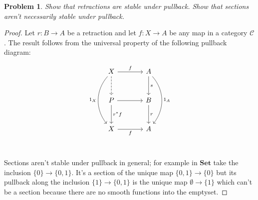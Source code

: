 \documentclass[11pt]{amsart}
\theoremstyle{plain}
\newtheorem{prob}[thm]{Problem}
\theoremstyle{definition}
\newcommand{\cC}{{\mathcal C}}
\newcommand{\Set}{{\mathbf{Set}}}
\newcommand{\noi}{{\noindent}}
\begin{document}
    \begin{prob}
    Show that retractions are stable under pullback. Show that sections aren't necessarily stable under pullback. 
    \end{prob}
    \begin{proof}
    Let $r : B \to A$ be a retraction and let $f : X \to A$ be any map in a category $\cC$. The result follows from the universal property of the following pullback diagram: 

    \[\begin{tikzcd}[column sep = large, row sep = large]
    X & A \\
    P & B \\
    X & A 
    \arrow[from=1-1,to=1-2, "f"]
    \arrow[from=1-2,to=3-2, bend left = 40, "1_A"]
    \arrow[from=1-1,to=3-1, bend right = 40, "1_X"']
    \arrow[from=1-1,to=2-1, dashed, ""']
    \arrow[from=2-1,to=2-2, ""']
    \arrow[from=1-2,to=2-2, "s"]
    \arrow[from=2-1,to=3-1, "r^*f"]
    \arrow[from=2-2,to=3-2, "r"]
    \arrow[from=3-1,to=3-2, "f"']
    \end{tikzcd}\]\

    \noi Sections aren't stable under pullback in general; for example in $\Set$ take the inclusion $\{0\} \to \{0,1\}$. It's a section of the unique map $\{0,1\} \to \{0\}$ but its pullback along the inclusion $\{1\} \to \{0,1\}$ is the unique map $\emptyset \to \{1\}$ which can't be a section because there are no smooth functions into the emptyset. 
    \end{proof}
\end{document}
